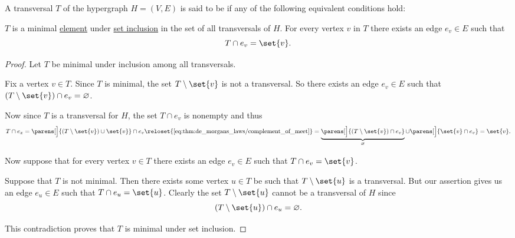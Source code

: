 \begin{definition}\label{def:graph/hypergraph_minimal_transversal}
  A transversal \( T \) of the hypergraph \( H = (V, E) \) is said to be  if any of the following equivalent conditions hold:
  \begin{thmenum}
     \( T \) is a minimal \hyperref[def:partially_ordered_set_extremal_points/maximal_and_minimal_element]{element} under \hyperref[def:subset]{set inclusion} in the set of all transversals of \( H \).
     For every vertex \( v \) in \( T \) there exists an edge \( e_v \in E \) such that
    \begin{equation*}
      T \cap e_v = \set{ v }.
    \end{equation*}
  \end{thmenum}
\end{definition}
\begin{proof}
   Let \( T \) be minimal under inclusion among all transversals.

  Fix a vertex \( v \in T \). Since \( T \) is minimal, the set \( T \setminus \set{ v } \) is not a transversal. So there exists an edge \( e_v \in E \) such that \( (T \setminus \set{ v }) \cap e_v = \varnothing \).

  Now since \( T \) is a transversal for \( H \), the set \( T \cap e_v \) is nonempty and thus
  \begin{equation*}
    T \cap e_x
    =
    \parens[\Big]{ (T \setminus \set{ v }) \cup \set{ v } } \cap e_v
    \reloset {\eqref{eq:thm:de_morgans_laws/complement_of_meet}} =
    \underbrace{\parens[\Big]{ (T \setminus \set{ v }) \cap e_v }}_{\varnothing} \cup \parens[\Big]{ \set{ v } \cap e_v }
    =
    \set{ v }.
  \end{equation*}

   Now suppose that for every vertex \( v \in T \) there exists an edge \( e_v \in E \) such that \( T \cap e_v = \set{ v } \).

  Suppose that \( T \) is not minimal. Then there exists some vertex \( u \in T \) be such that \( T \setminus \set{ u } \) is a transversal. But our assertion gives us an edge \( e_u \in E \) such that \( T \cap e_u = \set{ u } \). Clearly the set \( T \setminus \set{ u } \) cannot be a transversal of \( H \) since
  \begin{equation*}
    (T \setminus \set{ u }) \cap e_u = \varnothing.
  \end{equation*}

  This contradiction proves that \( T \) is minimal under set inclusion.
\end{proof}

